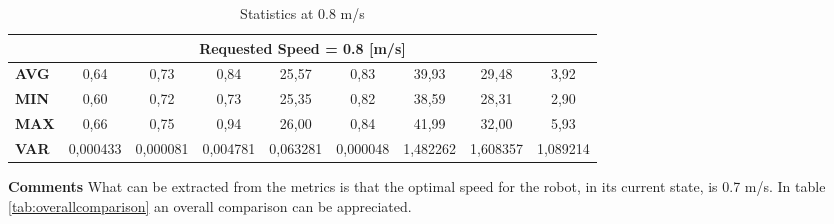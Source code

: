 \begin{table}[H]
{\begin{tabular}{|lcccccccc|}
\multicolumn{9}{|c|}{\textbf{Requested Speed = 0.8 {[}m/s{]}}} \\ \hline
\multicolumn{1}{|l|}{\textbf{AVG}} &
  \multicolumn{1}{c|}{{\color[HTML]{595959} 0,64}} &
  \multicolumn{1}{c|}{{\color[HTML]{595959} 0,73}} &
  \multicolumn{1}{c|}{{\color[HTML]{595959} 0,84}} &
  \multicolumn{1}{c|}{{\color[HTML]{595959} 25,57}} &
  \multicolumn{1}{c|}{{\color[HTML]{595959} 0,83}} &
  \multicolumn{1}{c|}{{\color[HTML]{595959} 39,93}} &
  \multicolumn{1}{c|}{{\color[HTML]{595959} 29,48}} &
  {\color[HTML]{595959} 3,92} \\ \hline
\multicolumn{1}{|l|}{\textbf{MIN}} &
  \multicolumn{1}{c|}{{\color[HTML]{595959} 0,60}} &
  \multicolumn{1}{c|}{{\color[HTML]{595959} 0,72}} &
  \multicolumn{1}{c|}{{\color[HTML]{595959} 0,73}} &
  \multicolumn{1}{c|}{{\color[HTML]{595959} 25,35}} &
  \multicolumn{1}{c|}{{\color[HTML]{595959} 0,82}} &
  \multicolumn{1}{c|}{{\color[HTML]{595959} 38,59}} &
  \multicolumn{1}{c|}{{\color[HTML]{595959} 28,31}} &
  {\color[HTML]{595959} 2,90} \\ \hline
\multicolumn{1}{|l|}{\textbf{MAX}} &
  \multicolumn{1}{c|}{{\color[HTML]{595959} 0,66}} &
  \multicolumn{1}{c|}{{\color[HTML]{595959} 0,75}} &
  \multicolumn{1}{c|}{{\color[HTML]{595959} 0,94}} &
  \multicolumn{1}{c|}{{\color[HTML]{595959} 26,00}} &
  \multicolumn{1}{c|}{{\color[HTML]{595959} 0,84}} &
  \multicolumn{1}{c|}{{\color[HTML]{595959} 41,99}} &
  \multicolumn{1}{c|}{{\color[HTML]{595959} 32,00}} &
  {\color[HTML]{595959} 5,93} \\ \hline
\multicolumn{1}{|l|}{\textbf{VAR}} &
  \multicolumn{1}{c|}{{\color[HTML]{595959} 0,000433}} &
  \multicolumn{1}{c|}{{\color[HTML]{595959} 0,000081}} &
  \multicolumn{1}{c|}{{\color[HTML]{595959} 0,004781}} &
  \multicolumn{1}{c|}{{\color[HTML]{595959} 0,063281}} &
  \multicolumn{1}{c|}{{\color[HTML]{595959} 0,000048}} &
  \multicolumn{1}{c|}{{\color[HTML]{595959} 1,482262}} &
  \multicolumn{1}{c|}{{\color[HTML]{595959} 1,608357}} &
  {\color[HTML]{595959} 1,089214} \\ \hline
\end{tabular}%
}
\caption{Statistics at 0.8 m/s}
\label{tab:speed08test}
\end{table}
\textbf{Comments} 
What can be extracted from the metrics is that the optimal speed for the robot, in its current state, is 0.7 m/s.
In table \ref{tab:overallcomparison} an overall comparison can be appreciated.
